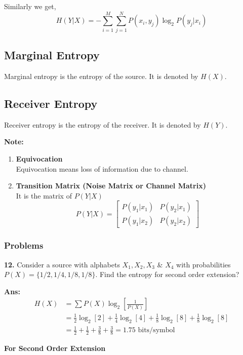 \documentclass[12pt]{article}
\begin{document}
Similarly we get,
$$H(Y|X) = - \sum_{i=1}^{M} \sum_{j=1}^{N} P(x_i, y_j) \log_2 P(y_j|x_i)$$

\subsection{Marginal Entropy}
Marginal entropy is the entropy of the source. It is denoted by $H(X)$.

\subsection{Receiver Entropy}
Receiver entropy is the entropy of the receiver. It is denoted by $H(Y)$.

\textbf{Note:}
\begin{enumerate}
	\item[i.] \textbf{Equivocation}\\
	      Equivocation means loss of information due to channel.
	\item[ii.] \textbf{Transition Matrix (Noise Matrix or Channel Matrix)}\\
	      It is the matrix of $P(Y|X)$
	      $$P(Y|X) = \begin{bmatrix}
			      P(y_1|x_1) & P(y_2|x_1) \\
			      P(y_1|x_2) & P(y_2|x_2)
		      \end{bmatrix}$$
\end{enumerate}

\subsubsection*{Problems}

\textbf{12.} Consider a source with alphabets $X_1, X_2, X_3$ \& $X_4$ with probabilities $P(X) = \{1/2, 1/4, 1/8, 1/8\}$. Find the entropy for second order extension?

\textbf{Ans:}
\begin{align*}
	H(X) & = \sum P(X) \log_2 \left[ \frac{1}{P(X)} \right]                                            \\
	     & = \frac{1}{2}\log_2[2] + \frac{1}{4}\log_2[4] + \frac{1}{8}\log_2[8] + \frac{1}{8}\log_2[8] \\
	     & = \frac{1}{2} + \frac{1}{2} + \frac{3}{8} + \frac{3}{8} = 1.75 \text{ bits/symbol}
\end{align*}

\textbf{For Second Order Extension}
\end{document}
